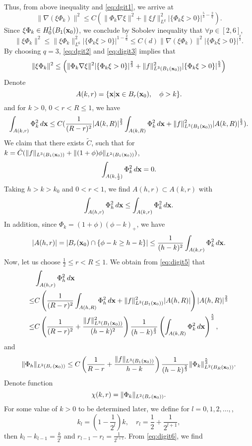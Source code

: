 \documentclass{elsarticle}
\newcommand{\be}{\begin{equation}}
\newcommand{\ee}{\end{equation}}
\newcommand{\bx}{{\bf x} }
\renewcommand{\ldots}{\dotsc}
\begin{document}
Thus, from above inequality and \eqref{eq:dgit1}, we arrive at
\be\label{eq:dgit2}
\|\nabla(\xi\Phi_k)\|^2\leq C\left(\|\Phi_k\nabla\xi\|^2+\|\xi f\|_{L^q}^2|\{\Phi_k\xi>0\}|^{\frac{5}{3}-\frac{2}{q}}\right).
\ee
Since $\xi\Phi_k\in H_0^1(B_1(\bx_0))$, we conclude by Sobolev inequality that $\forall p\in[2,6]$,
\be\label{eq:digit3}
\|\xi\Phi_k\|^2\leq \|\xi\Phi_k\|_{L^6}^2|\{\Phi_k\xi>0\}|^{1-\frac{2}{6}}\leq C(d)\|\nabla(\xi\Phi_k)\|^2|\{\Phi_k\xi>0\}|^{\frac23}.
\ee
By choosing  $q=3$, \eqref{eq:dgit2} and \eqref{eq:digit3} implies that
\be\label{eq:digit4}
\|\xi\Phi_k\|^2\leq \left(\|\Phi_k\nabla\xi\|^2|\{\Phi_k\xi>0\}|^{\frac{2}{3}}+\|f\|_{L^3(B_1(\bx_0))}^2|\{\Phi_k\xi>0\}|^{\frac{5}{3}}\right)
\ee
Denote
\be
A(k,r)=\{\bx|\bx\in B_r(\bx_0),\quad \phi>k\}.
\ee
and for $k>0$, $0<r<R\leq1$, we have
\begin{equation}\label{eq:digit5}
\int_{A(k,r)}\Phi_k^2\,d\bx\leq C(\frac{1}{(R-r)^2}|A(k,R)|^{\frac23}\int_{A(k,R)}\Phi_k^2\,d\bx+\|f\|_{L^3(B_1(\bx_0))}^2|A(k,R)|^{\frac{5}{3}}).
\end{equation}
We claim that there exists $\tilde{C}$, such that for $k=\tilde{C}(\|f\|_{L^3(B_1(\bx_0))}+\|(1+\phi)\phi\|_{L^2(B_1(\bx_0))})$,
\be\label{eq:digit-bd}
\int_{A(k,\frac12)}\Phi_k^2\,d\bx=0.
\ee
Taking $h>k>k_0$ and $0<r<1$, we find $A(h,r)\subset A(k,r)$ with
\be
\int_{A(h,r)}\Phi_h^2\,d\bx\leq\int_{A(k,r)}\Phi_k^2\,d\bx.
\ee
In addition, since $\Phi_k=(1+\phi)(\phi-k)_+$, we have
\be
|A(h,r)|=|B_r(\bx_0)\cap\{\phi-k\ge h-k\}|\leq \frac{1}{(h-k)^2}\int_{A(k,r)}\Phi_k^2\,d\bx.
\ee
Now, let us choose $\frac12\leq r<R\leq1$. We obtain from \eqref{eq:digit5} that
\begin{align*}
&\int_{A(h,r)}\Phi_h^2\,d\bx\\
\leq&C\left(\frac{1}{(R-r)^2}\int_{A(h,R)}\Phi_h^2\,d\bx+\|f\|_{L^3(B_1(\bx_0))}^2|A(h,R)|\right)|A(h,R)|^{\frac23}\\
\leq&C\left(\frac{1}{(R-r)^2}+\frac{\|f\|_{L^3(B_1(\bx_0))}^2}{(h-k)^2}\right)\frac{1}{(h-k)^{\frac43}}\left(\int_{A(k,R)}\Phi_k^2\,d\bx\right)^{\frac53},
\end{align*}
and
\be\label{eq:digit6}
\|\Phi_h\|_{L^2(B_r(\bx_0))}\leq C\left(\frac{1}{R-r}+\frac{\|f\|_{L^3(B_1(\bx_0))}}{h-k}\right)\frac{1}{(h-k)^{\frac23}}\|\Phi_k\|_{L^2(B_R(\bx_0))}^{\frac53}.
\ee
Denote function
\be
\chi(k,r)=\|\Phi_k\|_{L^2(B_r(\bx_0))}.
\ee
For some value of $k>0$ to be determined later, we define for $l=0,1,2,\ldots,$,
\be
k_l=(1-\frac{1}{2^l})k,\quad r_l=\frac12+\frac{1}{2^{l+1}},
\ee
then $k_l-k_{l-1}=\frac{k}{2^l}$ and $r_{l-1}-r_{l}=\frac{1}{2^{l+1}}$. From \eqref{eq:digit6}, we find
\end{document}
